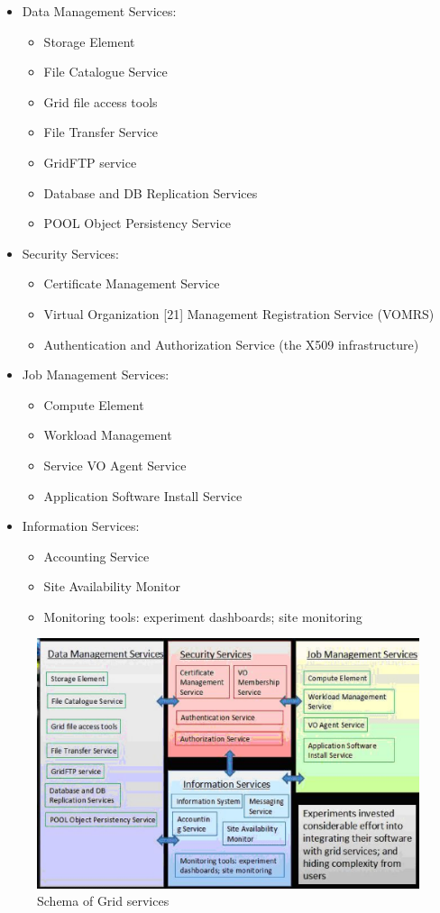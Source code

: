 \begin{itemize}
\item Data Management Services:
%
\begin{itemize}
\item Storage Element
\item File Catalogue Service
\item Grid file access tools
\item File Transfer Service
\item GridFTP service
\item Database and DB Replication Services
\item POOL Object Persistency Service
\end{itemize}
%
\item Security Services:
%
\begin{itemize}
\item Certificate Management Service
\item Virtual Organization [21] Management Registration Service (VOMRS)
\item Authentication and Authorization Service (the X509 infrastructure)
\end{itemize}
%
\item Job Management Services:
%
\begin{itemize}
\item Compute Element
\item Workload Management
\item Service VO Agent Service
\item Application Software Install Service
\end{itemize}
%
\item Information Services:
%
\begin{itemize}
\item Accounting Service
\item Site Availability Monitor
\item Monitoring tools: experiment dashboards; site monitoring
\end{itemize}
%
\end{itemize}

\begin{figure}[htb] %
\centering
\includegraphics[width=13cm]{fig10.eps} %
\caption{Schema of Grid services}\label{fig10}
\end{figure}



